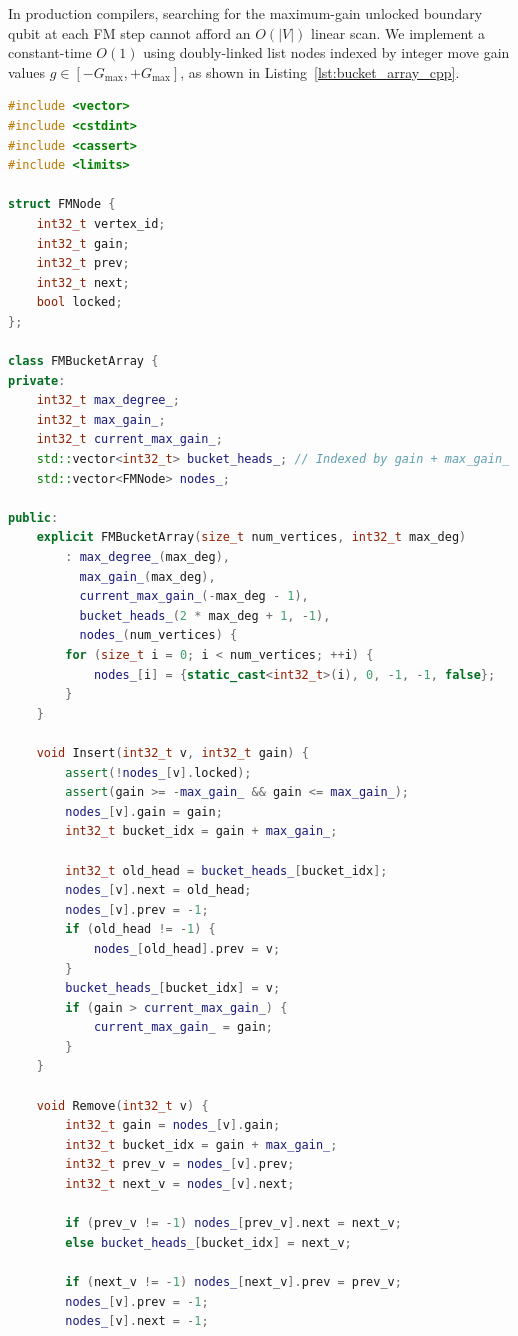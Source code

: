 In production compilers, searching for the maximum-gain unlocked boundary qubit at each FM step cannot afford an $O(|V|)$ linear scan. We implement a constant-time $O(1)$  using doubly-linked list nodes indexed by integer move gain values $g \in [-G_{\max}, +G_{\max}]$, as shown in Listing~\ref{lst:bucket_array_cpp}.

\begin{lstlisting}[language=C++, caption={High-Performance FM Gain Bucket Array in C++}, label={lst:bucket_array_cpp}]
#include <vector>
#include <cstdint>
#include <cassert>
#include <limits>

struct FMNode {
    int32_t vertex_id;
    int32_t gain;
    int32_t prev;
    int32_t next;
    bool locked;
};

class FMBucketArray {
private:
    int32_t max_degree_;
    int32_t max_gain_;
    int32_t current_max_gain_;
    std::vector<int32_t> bucket_heads_; // Indexed by gain + max_gain_
    std::vector<FMNode> nodes_;

public:
    explicit FMBucketArray(size_t num_vertices, int32_t max_deg)
        : max_degree_(max_deg),
          max_gain_(max_deg),
          current_max_gain_(-max_deg - 1),
          bucket_heads_(2 * max_deg + 1, -1),
          nodes_(num_vertices) {
        for (size_t i = 0; i < num_vertices; ++i) {
            nodes_[i] = {static_cast<int32_t>(i), 0, -1, -1, false};
        }
    }

    void Insert(int32_t v, int32_t gain) {
        assert(!nodes_[v].locked);
        assert(gain >= -max_gain_ && gain <= max_gain_);
        nodes_[v].gain = gain;
        int32_t bucket_idx = gain + max_gain_;
        
        int32_t old_head = bucket_heads_[bucket_idx];
        nodes_[v].next = old_head;
        nodes_[v].prev = -1;
        if (old_head != -1) {
            nodes_[old_head].prev = v;
        }
        bucket_heads_[bucket_idx] = v;
        if (gain > current_max_gain_) {
            current_max_gain_ = gain;
        }
    }

    void Remove(int32_t v) {
        int32_t gain = nodes_[v].gain;
        int32_t bucket_idx = gain + max_gain_;
        int32_t prev_v = nodes_[v].prev;
        int32_t next_v = nodes_[v].next;

        if (prev_v != -1) nodes_[prev_v].next = next_v;
        else bucket_heads_[bucket_idx] = next_v;

        if (next_v != -1) nodes_[next_v].prev = prev_v;
        nodes_[v].prev = -1;
        nodes_[v].next = -1;


\end{lstlisting}
